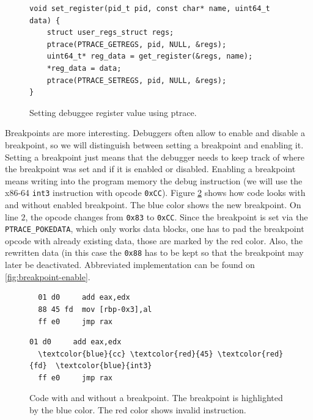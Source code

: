 \begin{figure}
    \begin{verbatim}
void set_register(pid_t pid, const char* name, uint64_t data) {
    struct user_regs_struct regs;
    ptrace(PTRACE_GETREGS, pid, NULL, &regs);
    uint64_t* reg_data = get_register(&regs, name);
    *reg_data = data;
    ptrace(PTRACE_SETREGS, pid, NULL, &regs);
}
    \end{verbatim}
    \caption{Setting debuggee register value using ptrace.}
    \label{fig:set-register}
\end{figure}

Breakpoints are more interesting. Debuggers often allow to enable and disable a
breakpoint, so we will distinguish between setting a breakpoint and enabling
it. Setting a breakpoint just means that the debugger needs to keep track of
where the breakpoint was set and if it is enabled or disabled. Enabling a
breakpoint means writing into the program memory the debug instruction (we will
use the x86-64 \texttt{int3} instruction with opcode \texttt{0xCC}). Figure
\ref{fig:with-and-without-bp} shows how code looks with and without enabled
breakpoint. The blue color shows the new breakpoint. On line $2$, the opcode
changes from \texttt{0x83} to \texttt{0xCC}. Since the breakpoint is set via
the \texttt{PTRACE\_POKEDATA}, which only works data blocks, one has to pad the
breakpoint opcode with already existing data, those are marked by the red
color. Also, the rewritten data (in this case the \texttt{0x88} has to be kept
so that the breakpoint may later be deactivated. Abbreviated implementation can
be found on \ref{fig:breakpoint-enable}.

\begin{figure}
    \begin{minipage}{0.45\textwidth}
        \begin{Verbatim}
  01 d0     add eax,edx
  88 45 fd  mov [rbp-0x3],al
  ff e0     jmp rax
        \end{Verbatim}
    \end{minipage}
    \hfill\vline\hfill
    \begin{minipage}{0.45\textwidth}
        \begin{Verbatim}[commandchars=\\\{\}]
  01 d0     add eax,edx
  \textcolor{blue}{cc} \textcolor{red}{45} \textcolor{red}{fd}  \textcolor{blue}{int3}
  ff e0     jmp rax
        \end{Verbatim}
    \end{minipage}
    \caption{Code with and without a breakpoint. The breakpoint is highlighted
    by the blue color. The red color shows invalid instruction.} 
    \label{fig:with-and-without-bp}
\end{figure}


